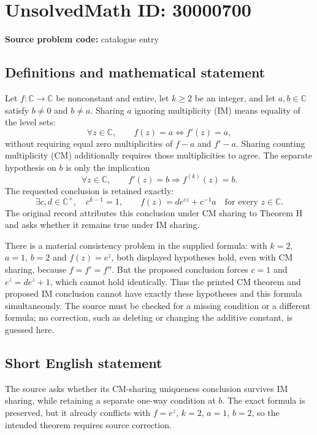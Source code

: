 \documentclass[11pt]{article}
\newcommand{\C}{\mathbb{C}}
\begin{document}
\section*{UnsolvedMath ID: 30000700}
\textbf{Source problem code:} catalogue entry
\subsection{Definitions and mathematical statement}
Let $f:\C\to\C$ be nonconstant and entire, let $k\geq2$ be an integer, and let $a,b\in\C$ satisfy $b\ne0$ and $b\ne a$. Sharing $a$ ignoring multiplicity (IM) means equality of the level sets:
\[
\forall z\in\C,\qquad f(z)=a\iff f'(z)=a,
\]
without requiring equal zero multiplicities of $f-a$ and $f'-a$. Sharing counting multiplicity (CM) additionally requires those multiplicities to agree. The separate hypothesis on $b$ is only the implication
\[
\forall z\in\C,\qquad f'(z)=b\Longrightarrow f^{(k)}(z)=b.
\]
The requested conclusion is retained exactly:
\[
\exists c,d\in\C^\times,\quad c^{k-1}=1,\qquad
f(z)=d e^{cz}+c^{-1}a\quad\text{for every }z\in\C.
\]
The original record attributes this conclusion under CM sharing to Theorem H and asks whether it remains true under IM sharing.

There is a material consistency problem in the supplied formula: with $k=2$, $a=1$, $b=2$ and $f(z)=e^z$, both displayed hypotheses hold, even with CM sharing, because $f=f'=f''$. But the proposed conclusion forces $c=1$ and $e^z=d e^z+1$, which cannot hold identically. Thus the printed CM theorem and proposed IM conclusion cannot have exactly these hypotheses and this formula simultaneously. The source must be checked for a missing condition or a different formula; no correction, such as deleting or changing the additive constant, is guessed here.
\subsection{Short English statement}
The source asks whether its CM-sharing uniqueness conclusion survives IM sharing, while retaining a separate one-way condition at $b$. The exact formula is preserved, but it already conflicts with $f=e^z$, $k=2$, $a=1$, $b=2$, so the intended theorem requires source correction.
\end{document}
